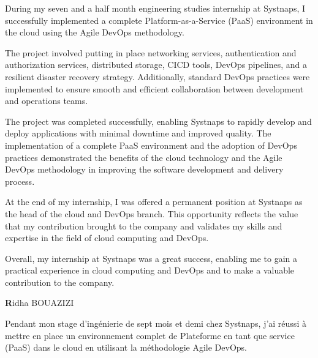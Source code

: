 \thispagestyle{empty}
\thispagestyle{empty}

\vspace{2cm}
\begin{center}

\end{center}
\vspace{0.8cm}

During my seven and a half month engineering studies internship at Systnaps, I successfully implemented a complete Platform-as-a-Service (PaaS) environment in the cloud using the Agile DevOps methodology. 

The project involved putting in place networking services, authentication and authorization services, distributed storage, CICD tools, DevOps pipelines, and a resilient disaster recovery strategy. Additionally, standard DevOps practices were implemented to ensure smooth and efficient collaboration between development and operations teams. 

The project was completed successfully, enabling Systnaps to rapidly develop and deploy applications with minimal downtime and improved quality. The implementation of a complete PaaS environment and the adoption of DevOps practices demonstrated the benefits of the cloud technology and the Agile DevOps methodology in improving the software development and delivery process. 

At the end of my internship, I was offered a permanent position at Systnaps as the head of the cloud and DevOps branch. This opportunity reflects the value that my contribution brought to the company and validates my skills and expertise in the field of cloud computing and DevOps. 

Overall, my internship at Systnaps was a great success, enabling me to gain a practical experience in cloud computing and DevOps and to make a valuable contribution to the company. 


\begin{flushright}
\textbf Ridha BOUAZIZI
\end{flushright}

\newpage
\thispagestyle{empty}
\begin{center}
\end{center}
\vspace{0.8cm}

    
Pendant mon stage d'ingénierie de sept mois et demi chez Systnaps, j'ai réussi à mettre en place un environnement complet de Plateforme en tant que service (PaaS) dans le cloud en utilisant la méthodologie Agile DevOps. 

